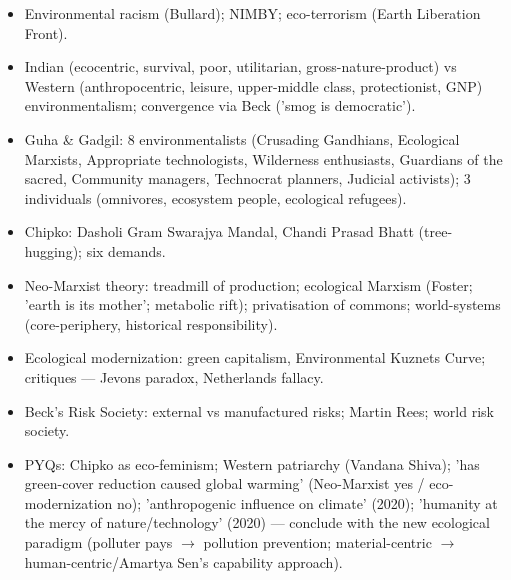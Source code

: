 \begin{QuickRevision}
\begin{itemize}
\item Environmental racism (Bullard); NIMBY; eco-terrorism (Earth Liberation Front).
\item Indian (ecocentric, survival, poor, utilitarian, gross-nature-product) vs Western (anthropocentric, leisure, upper-middle class, protectionist, GNP) environmentalism; convergence via Beck ('smog is democratic').
\item Guha \& Gadgil: 8 environmentalists (Crusading Gandhians, Ecological Marxists, Appropriate technologists, Wilderness enthusiasts, Guardians of the sacred, Community managers, Technocrat planners, Judicial activists); 3 individuals (omnivores, ecosystem people, ecological refugees).
\item Chipko: Dasholi Gram Swarajya Mandal, Chandi Prasad Bhatt (tree-hugging); six demands.
\item Neo-Marxist theory: treadmill of production; ecological Marxism (Foster; 'earth is its mother'; metabolic rift); privatisation of commons; world-systems (core-periphery, historical responsibility).
\item Ecological modernization: green capitalism, Environmental Kuznets Curve; critiques --- Jevons paradox, Netherlands fallacy.
\item Beck's Risk Society: external vs manufactured risks; Martin Rees; world risk society.
\item PYQs: Chipko as eco-feminism; Western patriarchy (Vandana Shiva); 'has green-cover reduction caused global warming' (Neo-Marxist yes / eco-modernization no); 'anthropogenic influence on climate' (2020); 'humanity at the mercy of nature/technology' (2020) --- conclude with the new ecological paradigm (polluter pays $\rightarrow$ pollution prevention; material-centric $\rightarrow$ human-centric/Amartya Sen's capability approach).
\end{itemize}
\end{QuickRevision}

